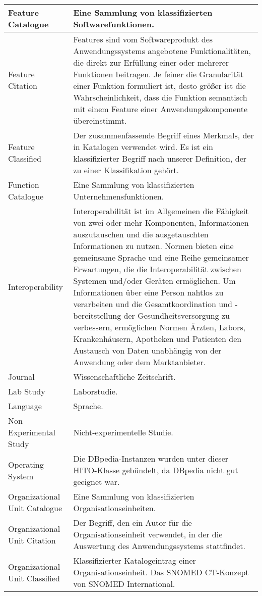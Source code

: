 \begin{longtable}{ | p{4 cm} | p{7 cm} | }
\hline
Feature Catalogue & Eine Sammlung von klassifizierten Softwarefunktionen. \\
\hline
Feature Citation & Features sind vom Softwareprodukt des Anwendungssystems angebotene Funktionalitäten, die direkt zur Erfüllung einer oder mehrerer Funktionen beitragen. Je feiner die Granularität einer Funktion formuliert ist, desto größer ist die Wahrscheinlichkeit, dass die Funktion semantisch mit einem Feature einer Anwendungskomponente übereinstimmt. \\
\hline
Feature Classified & Der zusammenfassende Begriff eines Merkmals, der in Katalogen verwendet wird. Es ist ein klassifizierter Begriff nach unserer Definition, der zu einer Klassifikation gehört.  \\
\hline
Function Catalogue & Eine Sammlung von klassifizierten Unternehmensfunktionen. \\
\hline
Interoperability & Interoperabilität ist im Allgemeinen die Fähigkeit von zwei oder mehr Komponenten, Informationen auszutauschen und die ausgetauschten Informationen zu nutzen. Normen bieten eine gemeinsame Sprache und eine Reihe gemeinsamer Erwartungen, die die Interoperabilität zwischen Systemen und/oder Geräten ermöglichen. Um Informationen über eine Person nahtlos zu verarbeiten und die Gesamtkoordination und -bereitstellung der Gesundheitsversorgung zu verbessern, ermöglichen Normen Ärzten, Labors, Krankenhäusern, Apotheken und Patienten den Austausch von Daten unabhängig von der Anwendung oder dem Marktanbieter. \\
\hline
Journal & Wissenschaftliche Zeitschrift. \\
\hline
Lab Study & Laborstudie. \\
\hline
Language & Sprache. \\
\hline
Non Experimental Study & Nicht-experimentelle Studie. \\
\hline
Operating System & Die DBpedia-Instanzen wurden unter dieser HITO-Klasse gebündelt, da DBpedia nicht gut geeignet war. \\
\hline
Organizational Unit Catalogue & Eine Sammlung von klassifizierten Organisationseinheiten. \\
\hline
Organizational Unit Citation & Der Begriff, den ein Autor für die Organisationseinheit verwendet, in der die Auswertung des Anwendungssystems stattfindet. \\
\hline
Organizational Unit Classified & Klassifizierter Katalogeintrag einer Organisationseinheit. Das SNOMED CT-Konzept von SNOMED International. \\

\end{longtable}
